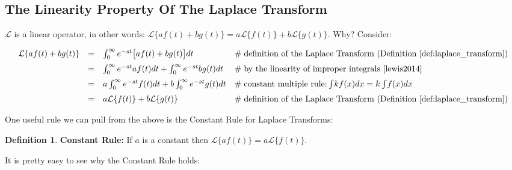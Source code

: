 \documentclass{article}
\theoremstyle{definition}
\newtheorem{definition}{Definition}[section]
\begin{document}
\subsection{The Linearity Property Of The Laplace Transform}
\label{subsec:linearity}
\bigskip
\noindent
$\mathcal{L}$ is a linear operator, in other words: $\mathcal{L}\{af (t) + bg(t)\} = a\mathcal{L}\{f(t)\} + b\mathcal{L}\{g(t)\}$. Why? Consider:

\bigskip
\begin{equation*}
\begin{array}{lllll}
\mathcal{L}\{af(t) + bg(t)\} 
&=& \int_0^\infty e^{-st} \big [af (t) + bg(t) \big] dt                                & \mathrel{\#} \text{definition of the Laplace Transform (Definition \ref{def:laplace_transform})}   \\  
[6pt]                                                                                                     %
&=& \int_0^\infty e^{-st} af (t)  dt + \int_0^\infty e^{-st}  bg(t)  dt          & \mathrel{\#} \text{by the linearity of improper integrals \cite{lewis2014}}                                     \\
[6pt]                                                                                                     %
&=& a \int_0^\infty e^{-st}  f(t) dt + b \int_0^\infty e^{-st}  g(t) dt          & \mathrel{\#} \text{constant multiple rule:} \int \! k f(x) dx = k \int \! f(x) dx                                    \\
[6pt]                                                                                                     %
&=& a \mathcal{L}\{f(t)\}  + b \mathcal{L}\{g(t)\}                                   & \mathrel{\#} \text{definition of the Laplace Transform  (Definition \ref{def:laplace_transform})}
\end{array}
\end{equation*}


\bigskip
\noindent
One useful rule we can pull from the above is the Constant Rule for Laplace Transforms:

\bigskip
\begin{definition} 
{\bf Constant Rule:} If $a$ is a constant then $\mathcal{L}\{a f(t)\} = a \mathcal{L}\{f(t)\}$.
\label{def:constant_rule}
\end{definition}

\bigskip
\noindent
It is pretty easy to see why the Constant Rule holds:
\end{document}
